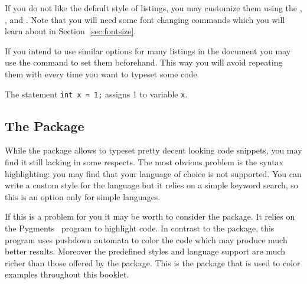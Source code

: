 If you do not like the default style of listings, you may customize them using
the , ,  and
. Note that you will need some font changing commands which
you will learn about in Section~\ref{sec:fontsize}.
\begin{example}

\end{example}

If you intend to use similar options for many listings in the document you may
use the  command to set them beforehand. This way you will avoid
repeating them with every time you want to typeset some code.

\begin{example}[examplewidth=0.4\linewidth]
\lstset{
  language=C,
  numbers=left,
  xleftmargin=1em, %
  breaklines,
  basicstyle=\ttfamily,
  prebreak=\textrightarrow,
}



The statement \lstinline|int x = 1;|
assigns 1 to variable \lstinline|x|.
\end{example}

\subsection{The  Package}

While the  package allows to typeset pretty decent looking code
snippets, you may find it still lacking in some respects. The most obvious
problem is the syntax highlighting: you may find that your language of choice
is not supported. You can write a custom style for the language but it relies
on a simple keyword search, so this is an option only for simple languages.

If this is a problem for you it may be worth to consider the 
package. It relies on the Pygments~\cite{pygments} program to highlight code.
In contrast to the  package, this program uses pushdown automata
to color the code which may produce much better results. Moreover the
predefined styles and language support are much richer than those offered by
the  package. This is the package that is used to color examples
throughout this booklet.

